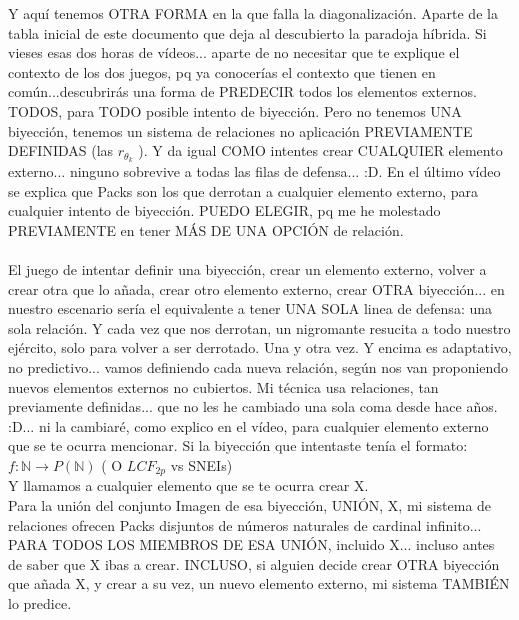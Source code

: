 	\noindent
	Y aquí tenemos OTRA FORMA en la que falla la diagonalización. Aparte de la tabla inicial de este documento que deja al descubierto la paradoja híbrida. Si vieses esas dos horas de vídeos... aparte de no necesitar que te explique el contexto de los dos juegos, pq ya conocerías el contexto que tienen en común...descubrirás una forma de PREDECIR todos los elementos externos. TODOS, para TODO posible intento de biyección. Pero no tenemos UNA biyección, tenemos un sistema de relaciones no aplicación PREVIAMENTE DEFINIDAS (las $r_{\theta_{k} }$ ). Y da igual COMO intentes crear CUALQUIER elemento externo... ninguno sobrevive a todas las filas de defensa... :D. En el último vídeo se explica que Packs son los que derrotan a cualquier elemento externo, para cualquier intento de biyección. PUEDO ELEGIR, pq me he molestado PREVIAMENTE en tener MÁS DE UNA OPCIÓN de relación. 
	\\\\
	
	\noindent
	El juego de intentar definir una biyección, crear un elemento externo, volver a crear otra que lo añada, crear otro elemento externo, crear OTRA biyección... en nuestro escenario sería el equivalente a tener UNA SOLA linea de defensa: una sola relación. Y cada vez que nos derrotan, un nigromante resucita a todo nuestro ejército, solo para volver a ser derrotado. Una y otra vez. Y encima es adaptativo, no predictivo... vamos definiendo cada nueva relación, según nos van proponiendo nuevos elementos externos no cubiertos. Mi técnica usa relaciones, tan previamente definidas... que no les he cambiado una sola coma desde hace años. :D... ni la cambiaré, como explico en el vídeo, para cualquier elemento externo que se te ocurra mencionar. Si la biyección que intentaste tenía el formato:\\
	$ f: \mathbb{N} \longrightarrow P(\mathbb{N})$   ( O $LCF_{2p}$ vs SNEIs) \\
	Y llamamos a cualquier elemento que se te ocurra crear X.\\
	Para la unión del conjunto Imagen de esa biyección, UNIÓN, X, mi sistema de relaciones ofrecen Packs disjuntos de números naturales de cardinal infinito... PARA TODOS LOS MIEMBROS DE ESA UNIÓN, incluido X... incluso antes de saber que X ibas a crear. INCLUSO, si alguien decide crear OTRA biyección que añada X, y crear a su vez, un nuevo elemento externo, mi sistema TAMBIÉN lo predice.
	\\\\
	
